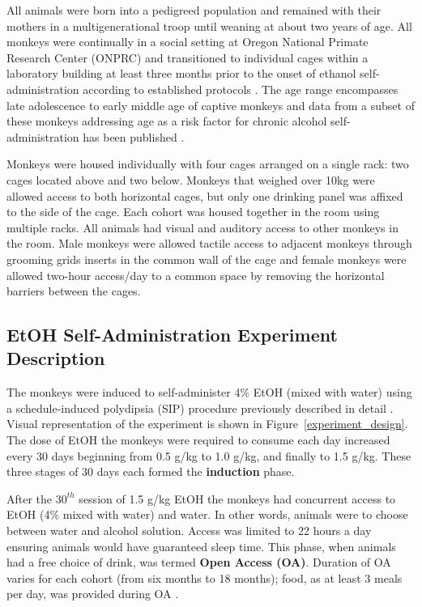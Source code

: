 	All animals were born into a pedigreed population and remained with their mothers in a multigenerational troop until weaning at about two years of age. All monkeys were continually in a social setting at Oregon National Primate Research Center (ONPRC) and transitioned to individual cages within a laboratory building at least three months prior to the onset of ethanol self-administration according to established protocols . The age range encompasses late adolescence to early middle age of captive monkeys and data from a subset of these monkeys addressing age as a risk factor for chronic alcohol self-administration has been published .
	
	Monkeys were housed individually with four cages arranged on a single rack: two cages located above and two below. Monkeys that weighed over 10kg were allowed access to both horizontal cages, but only one drinking panel was affixed to the side of the cage. Each cohort was housed together in the room using multiple racks. All animals had visual and auditory access to other monkeys in the room. Male monkeys were allowed tactile access to adjacent monkeys through grooming grids inserts in the common wall of the cage and female monkeys were allowed two-hour access/day to a common space by removing the horizontal barriers between the cages.
	
	
	\subsection{EtOH Self-Administration Experiment Description}
	The monkeys were induced to self-administer 4\% EtOH (mixed with water) using a schedule-induced polydipsia (SIP) procedure previously described in detail . Visual representation of the experiment is shown in Figure~\ref{experiment_design}. The dose of EtOH the monkeys were required to consume each day increased every 30 days beginning from 0.5 g/kg to 1.0 g/kg, and finally to 1.5 g/kg. These three stages of 30 days each formed the \textbf{induction} phase.
	
	After the $30^{th}$ session of 1.5 g/kg EtOH the monkeys had concurrent access to EtOH (4\% mixed with water) and water. In other words, animals were to choose between water and alcohol solution. Access was limited to 22 hours a day ensuring animals would have guaranteed sleep time. This phase, when animals had a free choice of drink, was termed \textbf{Open Access (OA)}. Duration of OA varies for each cohort (from six months to 18 months); food, as at least 3 meals per day, was provided during OA .
	
